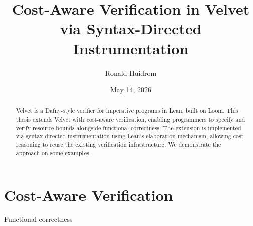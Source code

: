 \documentclass[12pt, oneside]{report}
\title{Cost-Aware Verification in Velvet via Syntax-Directed Instrumentation}
\author{Ronald Huidrom}
\date{May 14, 2026}
\begin{document}
\maketitle

\begin{abstract}
  Velvet is a Dafny-style verifier for imperative programs in Lean, built on
Loom. This thesis extends Velvet with cost-aware verification, enabling
programmers to specify and verify resource bounds alongside functional
correctness. The extension is implemented via syntax-directed instrumentation
using Lean’s elaboration mechanism, allowing cost reasoning to reuse the
existing verification infrastructure. We demonstrate the approach on some
examples.
\end{abstract}

\vfill
\tableofcontents
\vfill

\clearpage





\chapter{Cost-Aware Verification}

Functional correctness
\end{document}
